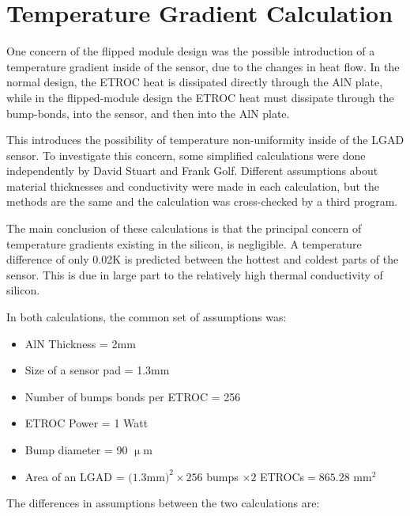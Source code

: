 \documentclass[11pt]{article}
\begin{document}
\newpage
\appendix
\appendixpage
\addappheadtotoc

\section{Temperature Gradient Calculation}
\label{sec:temperature-calculation}

One concern of the flipped module design was the possible introduction of a temperature gradient inside of the sensor, due to the changes in heat flow.
In the normal design, the ETROC heat is dissipated directly through the AlN plate, while in the flipped-module design the ETROC heat must dissipate through the bump-bonds, into the sensor, and then into the AlN plate.

This introduces the possibility of temperature non-uniformity inside of the LGAD sensor.
To investigate this concern, some simplified calculations were done independently by David Stuart and Frank Golf.
Different assumptions about material thicknesses and conductivity were made in each calculation, but the methods are the same and the calculation was cross-checked by a third program.

The main conclusion of these calculations is that the principal concern of temperature gradients existing in the silicon, is negligible.
A temperature difference of only 0.02K is predicted between the hottest and coldest parts of the sensor.
This is due in large part to the relatively high thermal conductivity of silicon.

In both calculations, the common set of assumptions was:

\begin{itemize}[noitemsep,topsep=-1em]
  \item AlN Thickness = 2mm
  \item Size of a sensor pad = 1.3mm
  \item Number of bumps bonds per ETROC = 256
  \item ETROC Power = 1 Watt
  \item Bump diameter = 90 $\upmu$m
  \item Area of an LGAD = $(1.3$mm$)^{2} \times 256$ bumps $ \times 2 $ ETROCs$= 865.28$ mm$^{2}$
\end{itemize}
\vspace{1em}

The differences in assumptions between the two calculations are:
\end{document}
